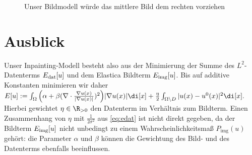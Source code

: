 \documentclass{mythesis}
\begin{document}
\begin{figure}[ht]
    \begin{subfigure}[b]{0.33\textwidth}
	\centering
    \end{subfigure}%
    \begin{subfigure}[b]{0.33\textwidth}
	\centering
    \end{subfigure}%
    \begin{subfigure}[b]{0.33\textwidth}
	\centering
    \end{subfigure}
    \caption{Unser Bildmodell würde das mittlere Bild dem rechten vorziehen}
    \label{fig:inpainting_texture}
\end{figure}

\section{Ausblick}

Unser Inpainting-Modell besteht also aus der Minimierung der Summe des $L^2$-Datenterms $E_{\mathrm{dat}}[u]$ und dem Elastica Bildterm $E_{\mathrm{img}}[u]$.
Bis auf additive Konstanten minimieren wir daher
\begin{math}
    E[u] := \int_\Omega \Big(\alpha + \beta ( \nabla \cdot \frac{\nabla u(x)}{|\nabla u(x)|})^2 \Big) |\nabla u(x)| \di[x]
    + \frac{\eta}{2} \int_{\Omega\setminus D} |u(x) - u^0(x)|^2 \di[x].
\end{math}
Hierbei gewichtet $\eta \in \R_{>0}$ den Datenterm im Verhältnis zum Bildterm.
Einen Zusammenhang von $\eta$ mit $\frac{1}{2\sigma^2}$ aus \eqref{eq:edat} ist nicht direkt gegeben, da der Bildterm $E_{\mathrm{img}}[u]$ nicht unbedingt zu einem Wahrscheinlichkeitsmaß $P_{\mathrm{img}}(u)$ gehört: die Parameter $\alpha$ und $\beta$ können die Gewichtung des Bild- und des Datenterms ebenfalls beeinflussen.
\end{document}
